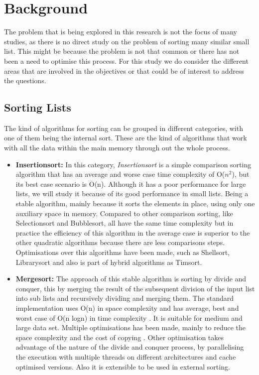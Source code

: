 \documentclass[a4paper,12pt]{article}
\begin{document}
\section{Background}

The problem that is being explored in this research is not the focus of many studies, as there is no direct study on the problem of sorting many similar small list. This might be because the problem is not that common or there has not been a need to optimise this process. For this study we do consider the different areas that are involved in the objectives or that could be of interest to address the questions.

\subsection {Sorting Lists}
The kind of algorithms for sorting can be grouped in different categories, with one of them being the internal sort. These are the kind of algorithms that work with all the data within the main memory through out the whole process.
\begin{itemize}
\item {\bf Insertionsort:}  In this category, {\it Insertionsort} is a simple comparison sorting algorithm that has an average and worse case time complexity of O(${n}^2$), but its best case scenario is O(n). Although it has a poor performance for large lists, we will study it because of its good performance in small lists. Being a stable algorithm, mainly because it sorts the elements in place, using only one auxiliary space in memory\cite{knuth1997artInsert}. Compared to other comparison sorting, like Selectionsort and Bubblesort, all have the same time complexity but in practice the efficiency of this algorithm in the average case is superior to the other quadratic algorithms because there are less comparisons steps. Optimisations over this algorithms have been made, such as Shellsort\cite{knuth1997artShell}, Librarysort\cite{bender2006insertion} and also is part of hybrid algorithms as Timsort\cite{Timsort}.

\item {\bf Mergesort:} The approach of this stable algorithm is sorting by divide and conquer, this by merging the result of the subsequent division of the input list into sub lists and recursively dividing and merging them. The standard implementation uses O(n) in space complexity and has average, best and worst case of O(n logn) in time complexity \cite{knuth1997artMerge}. It is suitable for medium and large data set. Multiple optimisations has been made, mainly to reduce the space complexity and the cost of copying \cite{Huang:1988:PIM:42392.42403}.  Other optimisation takes advantage of the nature of the divide and conquer process, by parallelising the execution with multiple threads \cite{chhugani2008efficient} on different architectures and cache optimised versions. Also it is extensible to be used in external sorting.
 \end{itemize}
\end{document}
